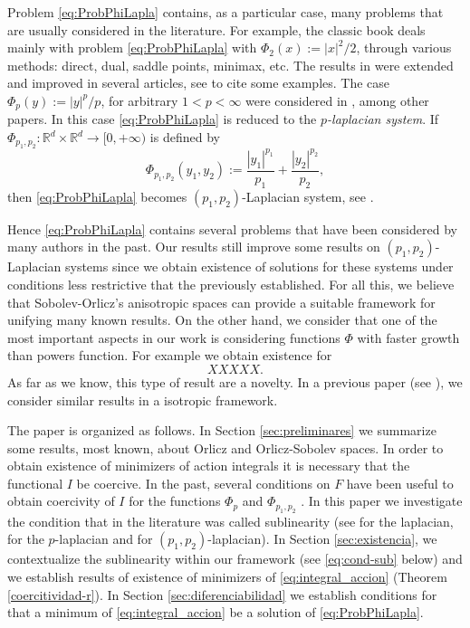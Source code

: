 \documentclass[twoside]{article}
\theoremstyle{remark}
\newcounter{example}[section]
\newcommand{\rr}{\mathbb{R}}
\begin{document}
  Problem \eqref{eq:ProbPhiLapla} contains, as a particular case, many problems that are usually considered in the literature.  For example, the classic book  \cite{mawhin2010critical} deals mainly with problem \eqref{eq:ProbPhiLapla} with $\Phi_2(x):=|x|^2/2$, through various methods: direct, dual, saddle points,  minimax, etc. The results in \cite{mawhin2010critical} were extended and improved in several articles,  see  \cite{tang1998periodic,tang2001periodic,tang1995periodic,wu1999periodic,zhao2004periodic}  to cite some examples. The case $\Phi_p(y):=|y|^p/p$, for arbitrary $1<p<\infty$ were considered in  \cite{tang2010periodic,Tian2007192}, among other papers. In this case \eqref{eq:ProbPhiLapla} is reduced to the \emph{$p$-laplacian system}.  If $\Phi_{p_1,p_2}:\rr^d\times \rr^d\to [0,+\infty)$  is defined by
\[\Phi_{p_1,p_2}(y_1,y_2):=\frac{|y_1|^{p_1}}{p_1}+\frac{|y_2|^{p_2}}{p_2},\] 
then \eqref{eq:ProbPhiLapla} becomes  $(p_1,p_2)$-Laplacian system, see
\cite{li2014periodic,pasca2010periodic,pacsca2010some,pasca2011some,pasca2016periodic,yang2012periodic,yang2013existence}.


Hence \eqref{eq:ProbPhiLapla}  contains several problems that have been considered by many authors in the past. Our results still improve some results on $(p_1,p_2)$-Laplacian systems since we obtain existence  of solutions for these systems under conditions less restrictive that the previously established.   
For all this, we believe that Sobolev-Orlicz's anisotropic spaces can provide a suitable framework for unifying many known results. On the other hand, we consider that one of the most important aspects in our work  is considering functions $\Phi$  with  faster growth than powers function. For example we obtain existence for 
\[XXXXX.\]  
As far as we know, this type of result  are a novelty. In a previous paper (see \cite{ABGMS2015}), we consider similar results in a isotropic framework.

The paper is organized as follows. In Section \ref{sec:preliminares}  we summarize some results, most known, about Orlicz and Orlicz-Sobolev spaces. In order to obtain existence of minimizers of action integrals it is necessary that the functional $I$ be coercive. 
In the past, several conditions on $F$ have been useful to obtain coercivity of $I$ for the functions  $\Phi_p$ and $\Phi_{p_1,p_2}$ . 
In this paper  we investigate the condition that in the literature was called sublinearity 
(see \cite{tang1998periodic,wu1999periodic,zhao2004periodic} for the laplacian, \cite{li2015infinitely,tang2010periodic} for the $p$-laplacian and \cite{li2014periodic,pasca2010periodic,pacsca2010some,yang2013existence} for $(p_1,p_2)$-laplacian). In Section \ref{sec:existencia},  we contextualize the sublinearity within our framework (see \eqref{eq:cond-sub} below) and we  establish results of existence of minimizers of \eqref{eq:integral_accion} (Theorem \ref{coercitividad-r}).   In  Section \ref{sec:diferenciabilidad}  we establish conditions for that a minimum of \eqref{eq:integral_accion}  be a solution of \eqref{eq:ProbPhiLapla}.
\end{document}
